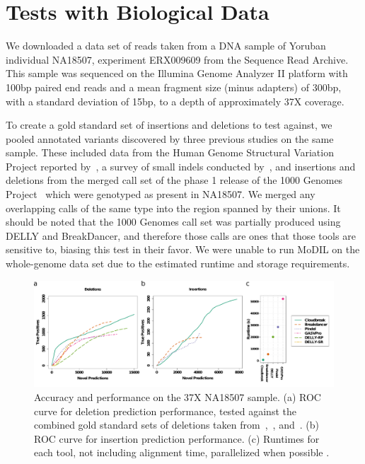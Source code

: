 \section{Tests with Biological Data}

We downloaded a data set of reads taken from a DNA sample of Yoruban individual NA18507, experiment ERX009609 from the Sequence Read Archive. This sample was sequenced on the Illumina Genome Analyzer II platform with 100bp paired end reads and a mean fragment size (minus adapters) of 300bp, with a standard deviation of 15bp, to a depth of approximately 37X coverage.

To create a gold standard set of insertions and deletions to test against, we pooled annotated variants discovered by three previous studies on the same sample. These included data from the Human Genome Structural Variation Project reported by~\cite{Kidd:2008p926}, a survey of small indels conducted by~\cite{Mills:2011fi}, and insertions and deletions from the merged call set of the phase 1 release of the 1000 Genomes Project~\cite{GenomesProjectConsortium:2012co} which were genotyped as present in NA18507. We merged any overlapping calls of the same type into the region spanned by their unions. It should be noted that the 1000 Genomes call set was partially produced using DELLY and BreakDancer, and therefore those calls are ones that those tools are sensitive to, biasing this test in their favor. We were unable to run MoDIL on the whole-genome data set due to the estimated runtime and storage requirements.

\begin{figure}
\centering
\includegraphics[width=1\textwidth]{figures/NA18507_rocs_runtime.pdf}
\caption{Accuracy and performance on the 37X NA18507 sample. (a) ROC curve for deletion prediction performance, tested against the combined gold standard sets of deletions taken from~\cite{Kidd:2008p926},~\cite{Mills:2011fi}, and~\cite{GenomesProjectConsortium:2012co}. (b) ROC curve for insertion prediction performance. (c) Runtimes for each tool, not including alignment time, parallelized when possible . }
\label{NA18507CombinedRoc}
\end{figure}

